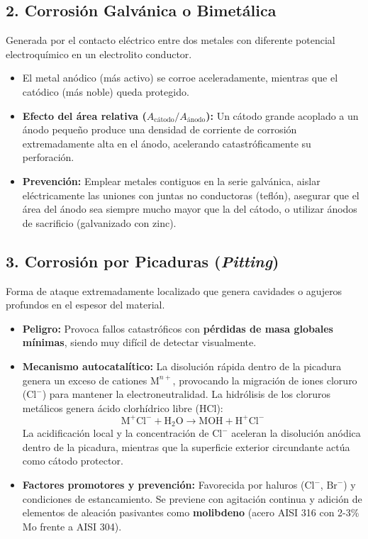 \subsection{2. Corrosión Galvánica o Bimetálica}
Generada por el contacto eléctrico entre dos metales con diferente potencial electroquímico en un electrolito conductor.
\begin{itemize}
    \item El metal anódico (más activo) se corroe aceleradamente, mientras que el catódico (más noble) queda protegido.
    \item \textbf{Efecto del área relativa ($A_{\text{cátodo}}/A_{\text{ánodo}}$):} Un cátodo grande acoplado a un ánodo pequeño produce una densidad de corriente de corrosión extremadamente alta en el ánodo, acelerando catastróficamente su perforación.
    \item \textbf{Prevención:} Emplear metales contiguos en la serie galvánica, aislar eléctricamente las uniones con juntas no conductoras (teflón), asegurar que el área del ánodo sea siempre mucho mayor que la del cátodo, o utilizar ánodos de sacrificio (galvanizado con zinc).
\end{itemize}

\subsection{3. Corrosión por Picaduras (\textit{Pitting})}
Forma de ataque extremadamente localizado que genera cavidades o agujeros profundos en el espesor del material.
\begin{itemize}
    \item \textbf{Peligro:} Provoca fallos catastróficos con \textbf{pérdidas de masa globales mínimas}, siendo muy difícil de detectar visualmente.
    \item \textbf{Mecanismo autocatalítico:} La disolución rápida dentro de la picadura genera un exceso de cationes $\text{M}^{n+}$, provocando la migración de iones cloruro ($\text{Cl}^-$) para mantener la electroneutralidad. La hidrólisis de los cloruros metálicos genera ácido clorhídrico libre ($\text{HCl}$):
          \begin{equation}
              \text{M}^+\text{Cl}^- + \text{H}_2\text{O} \longrightarrow \text{MOH} + \text{H}^+\text{Cl}^-
          \end{equation}
          La acidificación local y la concentración de $\text{Cl}^-$ aceleran la disolución anódica dentro de la picadura, mientras que la superficie exterior circundante actúa como cátodo protector.
    \item \textbf{Factores promotores y prevención:} Favorecida por haluros ($\text{Cl}^-$, $\text{Br}^-$) y condiciones de estancamiento. Se previene con agitación continua y adición de elementos de aleación pasivantes como \textbf{molibdeno} (acero AISI 316 con 2-3\% Mo frente a AISI 304).
\end{itemize}

